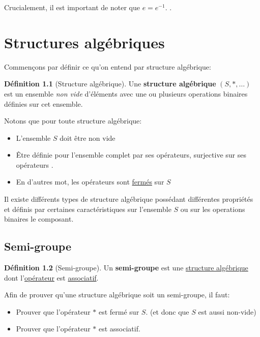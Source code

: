 \documentclass[12pt]{book}
\newcommand\todo[1]{\phantom{#1}}
\theoremstyle{definition}
\newtheorem{definition}{Définition}[section]
\begin{document}
Crucialement, il est important de noter que $e = e^{-1}$. \todo{Ajouter preuve}.

\chapter{Structures algébriques}
Commençons par définir ce qu'on entend par structure algébrique:
\begin{definition}[Structure algébrique]
    \label{def:structure_algebrique}
    Une \textbf{structure algébrique} $(S, \ast, \dots)$ est un ensemble \textit{non vide} d'éléments avec une ou plusieurs
    operations binaires définies sur cet ensemble.
\end{definition}
Notons que pour toute structure algébrique:
\begin{itemize}
    \item L'ensemble $S$ doit être non vide
    \item Être définie pour l'ensemble complet par ses opérateurs, surjective sur ses opérateurs \todo{Add link}.
    \item En d'autres mot, les opérateurs sont \hyperref[def:fermeture]{fermés} sur $S$
\end{itemize}

Il existe différents types de structure algébrique possédant différentes propriétés et définis par certaines
caractéristiques sur l'ensemble $S$ ou sur les operations binaires le composant.

\section{Semi-groupe}
\begin{definition}[Semi-groupe]
    \label{def:semi_groupe}
    Un \textbf{semi-groupe} est une \hyperref[def:structure_algebrique]{structure algébrique} dont l'\hyperref[def:operation_binaire]{opérateur} est 
    \hyperref[def:associativite]{associatif}.
\end{definition}
Afin de prouver qu'une structure algébrique soit un semi-groupe, il faut:
\begin{itemize}
    \item Prouver que l'opérateur $\ast$ est fermé sur $S$. (et donc que $S$ est aussi non-vide)
    \item Prouver que l'opérateur $\ast$ est associatif.
\end{itemize}
\end{document}

